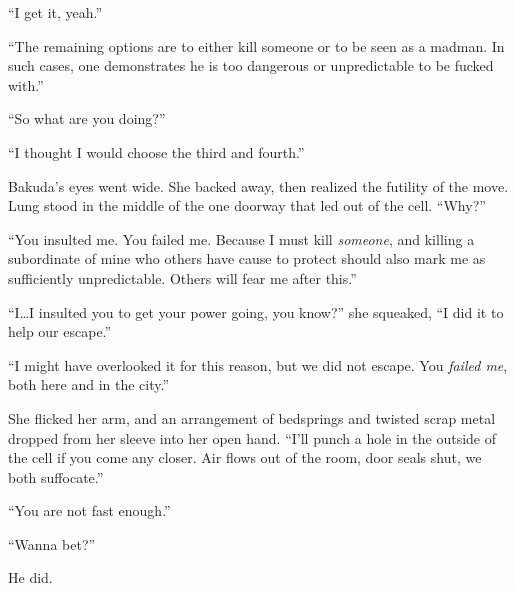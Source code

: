 ``I get it, yeah.''



``The remaining options are to either kill someone or to be seen as a madman.  In such cases, one demonstrates he is too dangerous or unpredictable to be fucked with.''



``So what are you doing?''



``I thought I would choose the third and fourth.''



Bakuda's eyes went wide.  She backed away, then realized the futility of the move.  Lung stood in the middle of the one doorway that led out of the cell.  ``Why?''



``You insulted me.  You failed me.  Because I must kill \emph{someone}, and killing a subordinate of mine who others have cause to protect should also mark me as sufficiently unpredictable.  Others will fear me after this.''



``I\ldots I insulted you to get your power going, you know?'' she squeaked, ``I did it to help our escape.''



``I might have overlooked it for this reason, but we did not escape. You \emph{failed me}, both here and in the city.''



She flicked her arm, and an arrangement of bedsprings and twisted scrap metal dropped from her sleeve into her open hand.  ``I'll punch a hole in the outside of the cell if you come any closer.  Air flows out of the room, door seals shut, we both suffocate.''



``You are not fast enough.''



``Wanna bet?''



He did.





